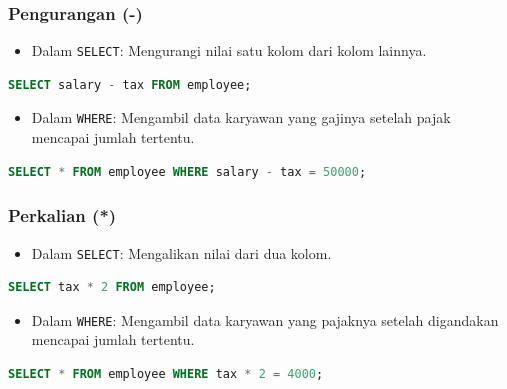 \documentclass{article}
\begin{document}
\subsubsection{Pengurangan (-)}
\begin{itemize}
    \item Dalam \texttt{SELECT}: Mengurangi nilai satu kolom dari kolom lainnya.
\end{itemize}
\begin{lstlisting}[language=SQL, caption={Pengurangan dalam SELECT}, captionpos=b]
SELECT salary - tax FROM employee;
\end{lstlisting}
\begin{itemize}
    \item Dalam \texttt{WHERE}: Mengambil data karyawan yang gajinya setelah pajak mencapai jumlah tertentu.
\end{itemize}
\begin{lstlisting}[language=SQL, caption={Pengurangan dalam WHERE}, captionpos=b]
SELECT * FROM employee WHERE salary - tax = 50000;
\end{lstlisting}

\subsubsection{Perkalian (*)}
\begin{itemize}
    \item Dalam \texttt{SELECT}: Mengalikan nilai dari dua kolom.
\end{itemize}
\begin{lstlisting}[language=SQL, caption={Perkalian dalam SELECT}, captionpos=b]
SELECT tax * 2 FROM employee;
\end{lstlisting}
\begin{itemize}
    \item Dalam \texttt{WHERE}: Mengambil data karyawan yang pajaknya setelah digandakan mencapai jumlah tertentu.
\end{itemize}
\begin{lstlisting}[language=SQL, caption={Perkalian dalam WHERE}, captionpos=b]
SELECT * FROM employee WHERE tax * 2 = 4000;
\end{lstlisting}
\end{document}
